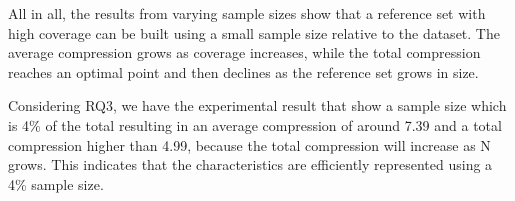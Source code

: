 All in all, the results from varying sample sizes show that a reference set with high coverage can be built using a small sample size relative to the dataset. The average compression grows as coverage increases, while the total compression reaches an optimal point and then declines as the reference set grows in size.

Considering RQ3, we have the experimental result that show a sample size which is 4\% of the total resulting in an average compression of around 7.39 and a total compression higher than 4.99, because the total compression will increase as N grows. This indicates that the characteristics are efficiently represented using a 4\% sample size.